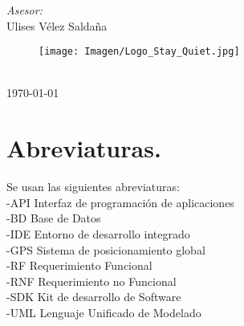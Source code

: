 \documentclass[10pt]{article}
\begin{document}
\begin{center}
\begin{minipage}{0.52\textwidth}
\begin{flushright}
\emph{Asesor:} \\                                                                 %
Ulises Vélez Saldaña \\                                             %
\end{flushright}                                                                 %
\end{minipage}
\begin{figure}[htbp!]
	\begin{center}
		\texttt{[image: Imagen/Logo\_Stay\_Quiet.jpg]}
	\end{center}
\end{figure}                          
\begin{center}   
\vspace*{1cm}
    
        \\                                                                     %
\vspace{1cm}                                                                                                                              
{\large \today}                                                                 %
            \end{center}                                                                        
\end{center}                                                                        
                                                                                    
\newpage                                                                        

\tableofcontents 

\newpage
\section{Abreviaturas.}
Se usan las siguientes abreviaturas: \\
-API		Interfaz de programación de aplicaciones \\
-BD		Base de Datos\\
-IDE		Entorno de desarrollo integrado\\ 
-GPS		Sistema de posicionamiento global\\
-RF		Requerimiento Funcional\\
-RNF		Requerimiento no Funcional\\
-SDK		Kit de desarrollo de Software\\ 
-UML		Lenguaje Unificado de Modelado 
 
\end{document}
